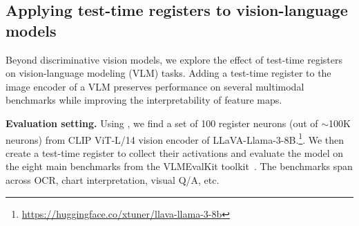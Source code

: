 \documentclass{article}
\begin{document}
\subsection{Applying test-time registers to vision-language models}
\label{section:vlm_results}
Beyond discriminative vision models, we explore the effect of test-time registers on vision-language modeling (VLM) tasks. Adding a test-time register to the image encoder of a VLM preserves performance on several multimodal benchmarks while improving the interpretability of feature maps.



\textbf{Evaluation setting.} Using , we find a set of 100 register neurons (out of ${\sim}$100K neurons) from CLIP ViT-L/14 vision encoder of LLaVA-Llama-3-8B.\footnote{\url{https://huggingface.co/xtuner/llava-llama-3-8b}}. We then create a test-time register to collect their activations and evaluate the model on the eight main benchmarks from the VLMEvalKit toolkit~\citep{duan2024vlmevalkit}. The benchmarks span across OCR, chart interpretation, visual Q/A, etc.


\begin{table}
\centering
\vspace{-0.4cm}
\caption{\textbf{Adding a test-time register maintains overall performance across multi-modal tasks.}} 
\vspace{-0.4cm}
\label{tab:vlm_comparison}
\end{table}
\end{document}
